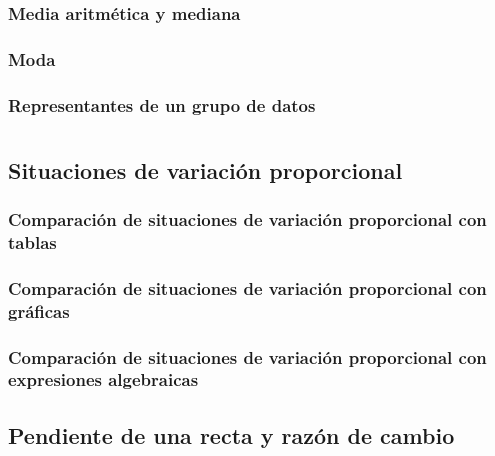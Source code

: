 \documentclass[11pt]{book}
\begin{document}

\subsection{Media aritm\'etica y mediana}

\subsection{Moda}
\subsection{Representantes de un grupo de datos}

\chapter{}

\section{Situaciones de variación proporcional}

\subsection{Comparación de situaciones de variación proporcional con tablas}

\subsection{Comparación de situaciones de variación proporcional con gráficas}

\subsection{Comparación de situaciones de variación proporcional con expresiones algebraicas}




\newpage \thispagestyle{plain}

\section{Pendiente de una recta y razón de cambio}
\end{document}
